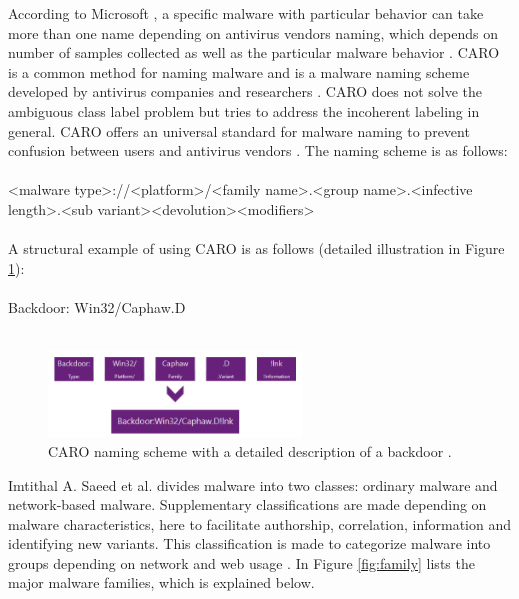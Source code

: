 \documentclass[12pt]{article} %
\begin{document}
According to Microsoft \cite{kosmidis2017machine}, a specific malware with particular behavior can take more than one name depending on antivirus vendors naming, which depends on number of samples collected as well as the particular malware behavior \cite{kosmidis2017machine}. CARO is a common method for naming malware and is a malware naming scheme developed by antivirus companies and researchers \cite{kosmidis2017machine}. CARO does not solve the ambiguous class label problem but tries to address the incoherent labeling in general. CARO offers an universal standard for malware naming to prevent confusion between users and antivirus vendors \cite{kosmidis2017machine}. The naming scheme is as follows: \\ \\
<malware type>://<platform>/<family name>.<group name>.<infective length>.<sub variant><devolution><modifiers>
\\ \\
A structural example of using CARO is as follows (detailed illustration in Figure \ref{fig:malwarenaming}):
\\ \\
Backdoor: Win32/Caphaw.D
\\ \\
\begin{figure}[H]
    \centering
    \includegraphics[width=0.6\textwidth]{malwarenaming}
    \captionsetup{width=0.8\textwidth}
    \caption{CARO naming scheme with a detailed description of a backdoor \cite{kosmidis2017machine}.}
    \label{fig:malwarenaming}
\end{figure}

Imtithal A. Saeed et al. \cite{Asurveyonmalware} divides malware into two classes: ordinary malware and network-based malware. Supplementary classifications are made depending on malware characteristics, here to facilitate authorship, correlation, information and identifying new variants. This classification is made to categorize malware into groups depending on network and web usage \cite{Asurveyonmalware}. In Figure \ref{fig:family} lists the major malware families, which is explained below.
\end{document}
